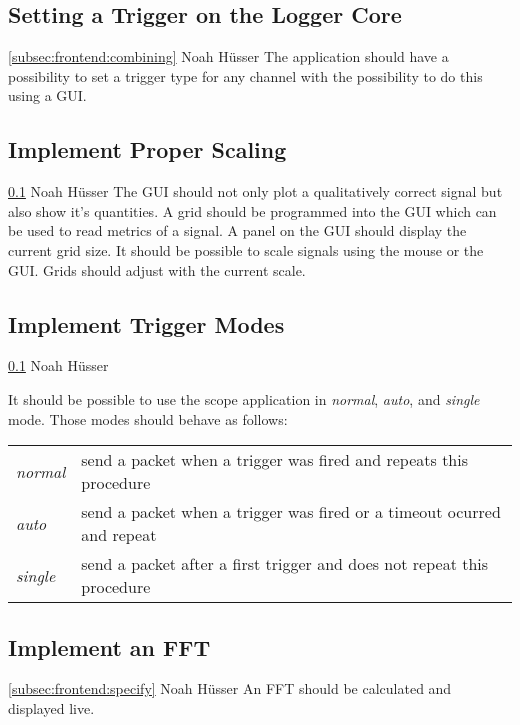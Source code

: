 \documentclass[a4paper,oneside]{alpenspecs/alpenspecs}
\begin{document}
\subsection{Setting a Trigger on the Logger Core}
\label{subsec:frontend:trig}
\wpac
    {}
    {}
    {}
    {\ref{subsec:frontend:combining}}
    {}
    {Noah Hüsser}
    {%
        The application should have a possibility to set a trigger type for any channel with the possibility to do this using a GUI.
    }

\subsection{Implement Proper Scaling}
\label{subsec:frontend:scaling}
\wpac
    {}
    {}
    {}
    {\ref{subsec:frontend:trig}}
    {}
    {Noah Hüsser}
    {%
        The GUI should not only plot a qualitatively correct signal but also show it's quantities.
        A grid should be programmed into the GUI which can be used to read metrics of a signal. A panel on the GUI should display the current grid size.
        It should be possible to scale signals using the mouse or the GUI. Grids should adjust with the current scale.
    }

\subsection{Implement Trigger Modes}
\label{subsec:frontend:modes}
\wpac
    {}
    {}
    {}
    {\ref{subsec:frontend:trig}}
    {}
    {Noah Hüsser}
    {%
        It should be possible to use the scope application in \textit{normal}, \textit{auto}, and \textit{single} mode. Those modes should behave as follows:
        \begin{tabular}{l l}
        \textit{normal} & send a packet when a trigger was fired and repeats this procedure \\
        \textit{auto} & send a packet when a trigger was fired or a timeout ocurred and repeat \\
        \textit{single} & send a packet after a first trigger and does not repeat this procedure
        \end{tabular}
    }

\subsection{Implement an FFT}
\label{subsec:frontend:fft}
\wpac
    {}
    {}
    {}
    {\ref{subsec:frontend:specify}}
    {}
    {Noah Hüsser}
    {%
        An FFT should be calculated and displayed live.
    }
\end{document}
